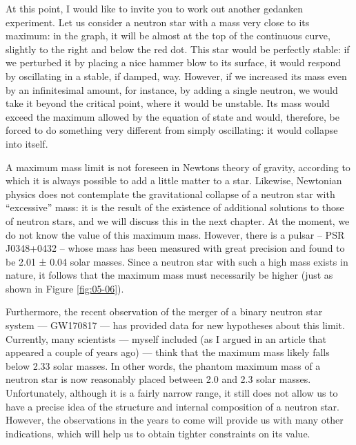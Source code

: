 At this point, I would like to invite you to work out another gedanken experiment. Let
us consider a neutron star with a mass very close to its maximum: in
the graph, it will be almost at the top of the continuous curve, slightly to the right
and below the red dot. This star would be perfectly stable: if we perturbed it by
placing a nice hammer blow to its surface, it would respond by oscillating in a stable,
if damped, way. However, if we increased its mass even by an infinitesimal amount, for
instance, by adding a single neutron, we would take it beyond the critical point, where
it would be unstable. Its mass would exceed the maximum allowed by the equation of state
and would, therefore, be forced to do something very different from simply oscillating:
it would collapse into itself.

A maximum mass limit is not foreseen in Newton\textquotesingle s theory of gravity,
according to which it is always possible to add a little matter to a star. Likewise,
Newtonian physics does not contemplate the gravitational collapse of a neutron star with
``excessive'' mass: it is the result of the existence of additional solutions to those
of neutron stars, and we will discuss this in the next chapter. At the moment, we do not
know the value of this maximum mass. However, there is a pulsar -- PSR
J0348+0432 -- whose mass has been measured with great precision and
found to be 2.01 ± 0.04 solar masses. Since a neutron star with such a high mass exists
in nature, it follows that the maximum mass must necessarily be higher (just as shown in
Figure \ref{fig:05-06}).

Furthermore, the recent observation of the merger of a binary neutron star
system --- GW170817 --- has provided data for new
hypotheses about this limit. Currently, many scientists --- myself included (as I argued
in an article that appeared a couple of years ago) --- think that the maximum mass
likely falls below 2.33 solar masses. In other words, the phantom maximum mass of a
neutron star is now reasonably placed between 2.0 and 2.3 solar masses. Unfortunately,
although it is a fairly narrow range, it still does not allow us to have a precise idea
of the structure and internal composition of a neutron star. However, the observations
in the years to come will provide us with many other indications, which will help us to
obtain tighter constraints on its value.

